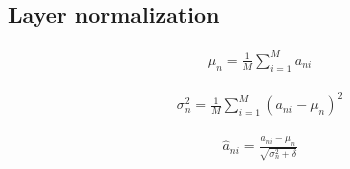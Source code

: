 \documentclass{article}
\begin{document}
\subsection{Layer normalization}

\begin{align*}
\mu_{n} =\frac{1}{M} \sum_{i=1}^{M} a_{n i}
\tag{7.58}
\end{align*}

\begin{align*}
\sigma_{n}^{2} =\frac{1}{M} \sum_{i=1}^{M}\left(a_{n i}-\mu_{n}\right)^{2}
\tag{7.59}
\end{align*}

\begin{align*}
\widehat{a}_{n i} =\frac{a_{n i}-\mu_{n}}{\sqrt{\sigma_{n}^{2}+\delta}}
\tag{7.60}
\end{align*}
\end{document}
